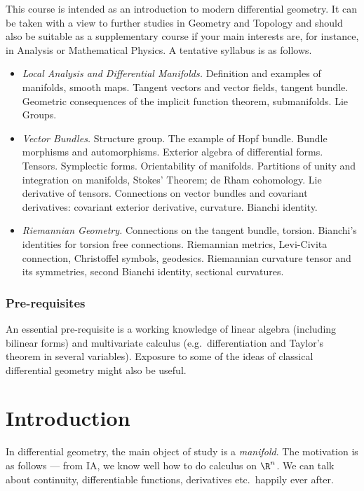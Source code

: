 \documentclass[a4paper]{article}
\begin{document}
\maketitle
{\small
\setlength{\parindent}{0em}
\setlength{\parskip}{1em}
This course is intended as an introduction to modern differential geometry. It can be taken with a view to further studies in Geometry and Topology and should also be suitable as a supplementary course if your main interests are, for instance, in Analysis or Mathematical Physics. A tentative syllabus is as follows.

\begin{itemize}[label={$\bullet$}]
  \item \emph{Local Analysis and Differential Manifolds.} Definition and examples of manifolds, smooth maps. Tangent vectors and vector fields, tangent bundle. Geometric consequences of the implicit function theorem, submanifolds. Lie Groups.

  \item \emph{Vector Bundles.} Structure group. The example of Hopf bundle. Bundle morphisms and automorphisms. Exterior algebra of differential forms. Tensors. Symplectic forms. Orientability of manifolds. Partitions of unity and integration on manifolds, Stokes' Theorem; de Rham cohomology. Lie derivative of tensors. Connections on vector bundles and covariant derivatives: covariant exterior derivative, curvature. Bianchi identity.

  \item \emph{Riemannian Geometry.} Connections on the tangent bundle, torsion. Bianchi's identities for torsion free connections. Riemannian metrics, Levi-Civita connection, Christoffel symbols, geodesics. Riemannian curvature tensor and its symmetries, second Bianchi identity, sectional curvatures.
\end{itemize}

\subsubsection*{Pre-requisites}
An essential pre-requisite is a working knowledge of linear algebra (including bilinear forms) and multivariate calculus (e.g.\ differentiation and Taylor's theorem in several variables). Exposure to some of the ideas of classical differential geometry might also be useful.
}
\tableofcontents

\setcounter{section}{-1}
\section{Introduction}
In differential geometry, the main object of study is a \emph{manifold}. The motivation is as follows --- from IA, we know well how to do calculus on $\R^n$. We can talk about continuity, differentiable functions, derivatives etc.\ happily ever after.
\end{document}
